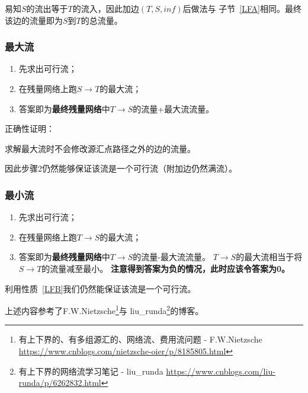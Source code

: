 易知$S$的流出等于$T$的流入，因此加边$(T,S,inf)$后做法与
子节~\ref{LFA}相同。最终该边的流量即为$S$到$T$的总流量。

\subsubsection{最大流}

\begin{enumerate}
    \item 先求出可行流；
    \item 在残量网络上跑$S\rightarrow T$的最大流；
    \item 答案即为{\bfseries 最终残量网络}中$T\rightarrow S$的流量+最大流流量。
\end{enumerate}

正确性证明：

\begin{property}\label{LFB}
    求解最大流时不会修改源汇点路径之外的边的流量。
\end{property}

因此步骤2仍然能够保证该流是一个可行流（附加边仍然满流）。

\subsubsection{最小流}

\begin{enumerate}
    \item 先求出可行流；
    \item 在残量网络上跑$T\rightarrow S$的最大流；
    \item 答案即为{\bfseries 最终残量网络}中$T\rightarrow S$的流量-最大流流量。
    $T\rightarrow S$的最大流相当于将$S\rightarrow T$的流量减至最小。
    {\bfseries 注意得到答案为负的情况，此时应该令答案为0。}
\end{enumerate}

利用性质~\ref{LFB}我们仍然能保证该流是一个可行流。

上述内容参考了F.W.Nietzsche\footnote{有上下界的、有多组源汇的、网络流、费用流问题 - F.W.Nietzsche
\url{https://www.cnblogs.com/nietzsche-oier/p/8185805.html}}与
liu\_runda\footnote{有上下界的网络流学习笔记 - liu\_runda
\url{https://www.cnblogs.com/liu-runda/p/6262832.html}}的博客。
